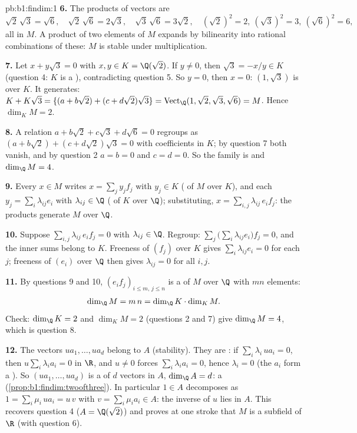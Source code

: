 \begin{solution}{pb:b1:findim:1}
\textbf{6.} The products of  vectors are
\[
\sqrt2\,\sqrt3 = \sqrt6,\quad
\sqrt2\,\sqrt6 = 2\sqrt3,\quad
\sqrt3\,\sqrt6 = 3\sqrt2,\quad
(\sqrt2)^2 = 2,\ (\sqrt3)^2 = 3,\ (\sqrt6)^2 = 6,
\]
all in $M$. A product of two elements of $M$ expands by
bilinearity into rational combinations of these: $M$ is stable
under multiplication.

\textbf{7.} Let $x + y\sqrt3 = 0$ with $x, y \in K = \Q(\sqrt2)$.
If $y \neq 0$, then $\sqrt3 = -x/y \in K$ (question 4: $K$ is a
), contradicting question 5. So $y = 0$, then $x = 0$: $(1,
\sqrt3)$ is  over $K$. It generates: $K + K\sqrt3 =
\{(a + b\sqrt2) + (c + d\sqrt2)\sqrt3\} = \operatorname{Vect}_\Q
(1, \sqrt2, \sqrt3, \sqrt6) = M$. Hence $\dim_K M = 2$.

\textbf{8.} A relation $a + b\sqrt2 + c\sqrt3 + d\sqrt6 = 0$
regroups as $(a + b\sqrt2) + (c + d\sqrt2)\sqrt3 = 0$ with
coefficients in $K$; by question 7 both vanish, and by question 2
$a = b = 0$ and $c = d = 0$. So the family is  and $\dim_\Q M
= 4$.

\textbf{9.} Every $x \in M$ writes $x = \sum_j y_j f_j$ with $y_j
\in K$ ( of $M$ over $K$), and each $y_j = \sum_i
\lambda_{ij} e_i$ with $\lambda_{ij} \in \Q$ ( of $K$ over
$\Q$); substituting, $x = \sum_{i,j} \lambda_{ij}\, e_i f_j$: the
products generate $M$ over $\Q$.

\textbf{10.} Suppose $\sum_{i,j} \lambda_{ij}\, e_i f_j = 0$ with
$\lambda_{ij} \in \Q$. Regroup: $\sum_j \bigl(\sum_i \lambda_{ij}
e_i\bigr) f_j = 0$, and the inner sums belong to $K$. Freeness of
$(f_j)$ over $K$ gives $\sum_i \lambda_{ij} e_i = 0$ for each
$j$; freeness of $(e_i)$ over $\Q$ then gives $\lambda_{ij} = 0$
for all $i, j$.

\textbf{11.} By questions 9 and 10, $(e_i f_j)_{i \leq m,\, j
\leq n}$ is a  of $M$ over $\Q$ with $mn$ elements:
\[
\dim_\Q M = m\,n = \dim_\Q K \cdot \dim_K M .
\]
Check: $\dim_\Q K = 2$ and $\dim_K M = 2$ (questions 2 and 7)
give $\dim_\Q M = 4$, which is question 8.

\textbf{12.} The vectors $u a_1, \dots, u a_d$ belong to $A$
(stability). They are : if $\sum_i \lambda_i\, u a_i = 0$,
then $u \sum_i \lambda_i a_i = 0$ in $\R$, and $u \neq 0$ forces
$\sum_i \lambda_i a_i = 0$, hence $\lambda_i = 0$ (the $a_i$ form
a ). So $(u a_1, \dots, u a_d)$ is a  of $d$
vectors in $A$, $\dim_\Q A = d$: a 
(\cref{prop:b1:findim:twoofthree}). In particular $1 \in A$
decomposes as $1 = \sum_i \mu_i\, u a_i = u\,v$ with $v = \sum_i
\mu_i a_i \in A$: the inverse of $u$ lies in $A$. This recovers
question 4 ($A = \Q(\sqrt2)$) and proves at one stroke that $M$
is a subfield of $\R$ (with question 6).


\end{solution}
